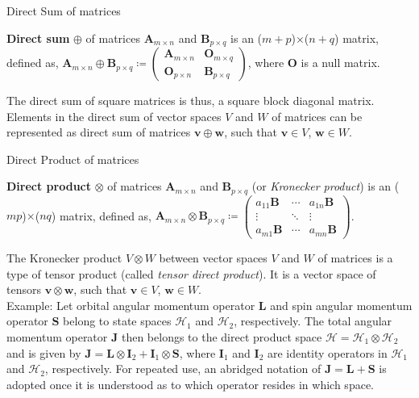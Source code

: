 \documentclass{beamer}
\newcommand\boldtext[1]{\textcolor{bolds}{\textbf{#1}}}
\newcommand\italictext[1]{\textcolor{italics}{\textit{#1}}}
\begin{document}
\begin{frame}{Direct Sum of matrices}
    \begin{definition}
        \boldtext{Direct sum} $\oplus$ of matrices $\mathbf{A}_{m\times n}$ and $\mathbf{B}_{p\times q}$ is an ($m+p$)$\times$($n+q$) matrix, defined as, $\mathbf{A}_{m\times n}\oplus\mathbf{B}_{p\times q}\coloneqq
        \begin{pmatrix}
            \mathbf{A}_{m\times n} & \mathbf{O}_{m\times q} \\
            \mathbf{O}_{p\times n} & \mathbf{B}_{p\times q}
        \end{pmatrix}$, where $\mathbf{O}$ is a null matrix.
    \end{definition}
    The direct sum of square matrices is thus, a square block diagonal  matrix.\\
    Elements in the direct sum of vector spaces $V$ and $W$ of matrices can be represented as direct sum of matrices $\mathbf{v}\oplus\mathbf{w}$, such that $\mathbf{v}\in V$, $\mathbf{w}\in W$.
\end{frame}

\begin{frame}{Direct Product of matrices}
    \begin{definition}
        \boldtext{Direct product} $\otimes$ of matrices $\mathbf{A}_{m\times n}$ and $\mathbf{B}_{p\times q}$ (or \italictext{Kronecker product}) is an ($mp$)$\times$($nq$) matrix, defined as, $\mathbf{A}_{m\times n}\otimes\mathbf{B}_{p\times q}\coloneqq
        \begin{pmatrix}
            a_{11}\mathbf{B} & \cdots & a_{1n}\mathbf{B} \\
            \vdots & \ddots & \vdots \\
            a_{m1}\mathbf{B} & \cdots & a_{mn}\mathbf{B}
        \end{pmatrix}$.
    \end{definition}
    The Kronecker product $V\otimes W$ between vector spaces $V$ and $W$ of matrices is a type of tensor product (called \italictext{tensor direct product}). It is a vector space of tensors $\mathbf{v}\otimes\mathbf{w}$, such that $\mathbf{v}\in V$, $\mathbf{w}\in W$.\\
    Example: Let orbital angular momentum operator $\mathbf{L}$ and spin angular momentum operator $\mathbf{S}$ belong to state spaces $\mathcal{H}_1$ and $\mathcal{H}_2$, respectively. The total angular momentum operator $\mathbf{J}$ then belongs to the direct product space $\mathcal{H}=\mathcal{H}_1\otimes\mathcal{H}_2$ and is given by $\mathbf{J}=\mathbf{L}\otimes\mathbf{I}_2+\mathbf{I}_1\otimes\mathbf{S}$, where $\mathbf{I}_1$ and $\mathbf{I}_2$ are identity operators in $\mathcal{H}_1$ and $\mathcal{H}_2$, respectively. For repeated use, an abridged notation of $\mathbf{J}=\mathbf{L}+\mathbf{S}$ is adopted once it is understood as to which operator resides in which space.
\end{frame}
\end{document}

